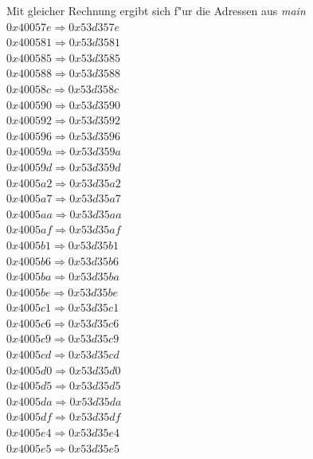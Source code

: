 \documentclass{ti2}
\begin{document}
Mit gleicher Rechnung ergibt sich f"ur die Adressen aus \emph{main}\\
$0x40057e \Rightarrow 0x53d357e$\\  
$0x400581 \Rightarrow 0x53d3581$\\
$0x400585 \Rightarrow 0x53d3585 $\\
$0x400588 \Rightarrow 0x53d3588 $\\
$0x40058c \Rightarrow 0x53d358c $\\
$0x400590 \Rightarrow 0x53d3590 $\\
$0x400592 \Rightarrow 0x53d3592 $\\
$0x400596 \Rightarrow 0x53d3596 $\\
$0x40059a \Rightarrow 0x53d359a $\\
$0x40059d \Rightarrow 0x53d359d $\\
$0x4005a2 \Rightarrow 0x53d35a2 $\\
$0x4005a7 \Rightarrow 0x53d35a7 $\\
$0x4005aa \Rightarrow 0x53d35aa $\\
$0x4005af \Rightarrow 0x53d35af $\\
$0x4005b1 \Rightarrow 0x53d35b1 $\\
$0x4005b6 \Rightarrow 0x53d35b6 $\\
$0x4005ba \Rightarrow 0x53d35ba $\\
$0x4005be \Rightarrow 0x53d35be $\\
$0x4005c1 \Rightarrow 0x53d35c1 $\\
$0x4005c6 \Rightarrow 0x53d35c6 $\\
$0x4005c9 \Rightarrow 0x53d35c9 $\\
$0x4005cd \Rightarrow 0x53d35cd $\\
$0x4005d0 \Rightarrow 0x53d35d0 $\\
$0x4005d5 \Rightarrow 0x53d35d5 $\\
$0x4005da \Rightarrow 0x53d35da $\\
$0x4005df \Rightarrow 0x53d35df $\\
$0x4005e4 \Rightarrow 0x53d35e4 $\\
$0x4005e5 \Rightarrow 0x53d35e5 $\\
\end{document}
